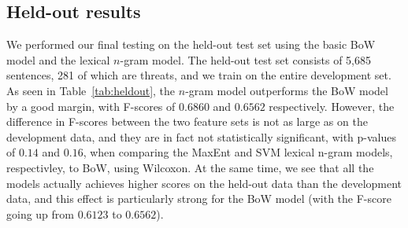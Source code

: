 \documentclass[11pt,letterpaper]{article}
\begin{document}
      
      


\subsection{Held-out results}
\label{sec:heldout}

We performed our final testing on the held-out test set using the basic BoW model and the lexical $n$-gram model. The held-out test set consists of 5,685 sentences, 281 of which are threats, and we train on the entire development set. As seen in Table~\ref{tab:heldout}, the $n$-gram model outperforms the BoW model by a good margin, with F-scores of $0.6860$ and $0.6562$ respectively. However, the difference in F-scores between the two feature sets is not as large as on the development data, and they are in fact not statistically significant, with p-values of $0.14$ and $0.16$, when comparing the MaxEnt and SVM lexical n-gram models, respectivley, to BoW, using Wilcoxon. At the same time, we see that all the models actually achieves higher scores on the held-out data than the development data, and this effect is particularly strong for the BoW model (with the F-score going up from $0.6123$ to $0.6562$). %


\end{document}
